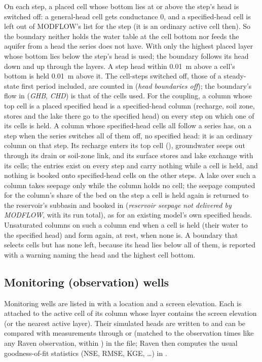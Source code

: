 On each step, a placed cell whose bottom lies at or above the step's head is switched off: a general-head cell gets
conductance 0, and a specified-head cell is left out of MODFLOW's list for the step (it is an ordinary active cell then).
So the boundary neither holds the water table at the cell bottom nor feeds the aquifer from a head the series does not
have. With  only the highest placed layer whose bottom lies below the step's head is used; the boundary
follows its head down and up through the layers. A step head within 0.01~m above a cell's bottom is held 0.01~m above
it. The cell-steps switched off, those of a steady-state first period included, are counted in 
(\emph{head boundaries off}); the boundary's flow in  (\emph{GHB}, \emph{CHD}) is that of the cells used.
For the coupling, a column whose top cell is a placed specified head is a specified-head column (recharge, soil zone,
stores and the lake there go to the specified head) on every step on which one of its cells is held. A column whose
specified-head cells all follow a  series has, on a step when the series switches all of them off, no
specified head: it is an ordinary column on that step. Its recharge enters its top cell (), groundwater
seeps out through its drain or soil-zone link, and its surface stores and lake exchange with its cells; the entries exist
on every step and carry nothing while a cell is held, and nothing is booked onto specified-head cells on the other steps.
A lake over such a column takes seepage only while the column holds no cell; the seepage computed for the column's
share of the bed on the step a cell is held again is returned to the reservoir's subbasin and booked in 
(\emph{reservoir seepage not delivered by MODFLOW}, with its run total), as for an existing model's own specified heads.
Unsaturated columns on such a column end when a cell is held (their water to the specified head) and form again, at
rest, when none is. A boundary that selects cells but has none left, because its head lies below all of them, is reported with a
warning naming the head and the highest cell bottom.

\subsection{Monitoring (observation) wells}
Monitoring wells are listed in  with a location and a screen elevation. Each is attached to the
active cell of its column whose layer contains the screen elevation (or the nearest active layer). Their simulated heads
are written to  and can be compared with measurements through  or
 (matched to the observation times like any Raven observation, within ) in the
 file; Raven then computes the usual goodness-of-fit statistics (NSE, RMSE, KGE, \dots) in .

